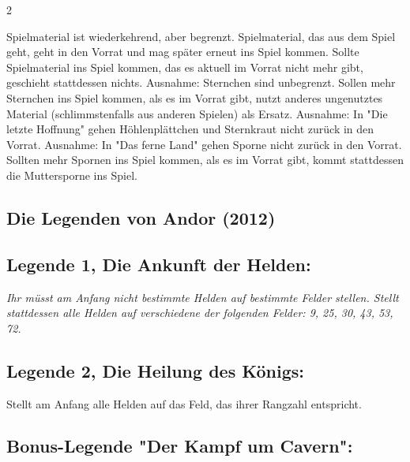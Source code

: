 \documentclass[10pt, a4paper, oneside]{book}
\newcommand{\fan}[1]{\textit{#1}}
\begin{document}
\begin{multicols*}{2}
\begin{nobgcolor}
\bullet{} Spielmaterial ist wiederkehrend, aber begrenzt. Spielmaterial, das aus dem Spiel geht, geht in den Vorrat und mag später erneut ins Spiel kommen. Sollte Spielmaterial ins Spiel kommen, das es aktuell im Vorrat nicht mehr gibt, geschieht stattdessen nichts.\newline
Ausnahme: Sternchen sind unbegrenzt. Sollen mehr Sternchen ins Spiel kommen, als es im Vorrat gibt, nutzt anderes ungenutztes Material (schlimmstenfalls aus anderen Spielen) als Ersatz.\newline
Ausnahme: In "Die letzte Hoffnung" gehen Höhlenplättchen\supercite{40676} und Sternkraut\supercite{dlh-ausruestungstafel} nicht zurück in den Vorrat.\newline
Ausnahme: In "Das ferne Land" gehen Sporne nicht zurück in den Vorrat. Sollten mehr Spornen ins Spiel kommen, als es im Vorrat gibt, kommt stattdessen die Muttersporne ins Spiel.\supercite{dfl-begleitheft}



\end{nobgcolor}






\begin{bgcolor}
\section{Die Legenden von Andor (2012)}





\subsection{Legende 1, Die Ankunft der Helden:}

\fan{Ihr müsst am Anfang nicht bestimmte Helden auf bestimmte Felder stellen. Stellt stattdessen alle Helden auf verschiedene der folgenden Felder: 9, 25, 30, 43, 53, 72.}



\subsection{Legende 2, Die Heilung des Königs:}

Stellt am Anfang alle Helden auf das Feld, das ihrer Rangzahl entspricht.
\supercite{dlva2-a,nh-begleitheft,dh-begleitheft,mh-begleitheft}



\subsection{Bonus-Legende "Der Kampf um Cavern":}


\end{bgcolor}
\end{multicols*}
\end{document}

